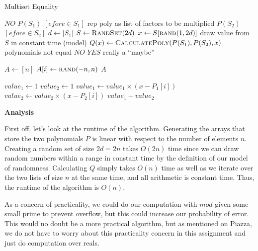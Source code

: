 \documentclass{article}
\begin{document}
\begin{algorithm}
    \caption{Multiset Equality}\label{euclid}
    \begin{algorithmic}[1]
         \Return $NO$ \EndIf
        \State $P(S_1)$ \gets $[e for e \in S_1]$  \Comment rep poly as list of factors to be multiplied
        \State $P(S_2)$ \gets $[e for e \in S_2]$
        \State $d \gets |S_1|$
        \State $S \gets \Call{RandSet}{2d}$
        \State $x \gets S[\Call{rand}{1, 2d}]$     \Comment draw value from $S$ in constant time (model)
        \State $Q(x) \gets \Call{CalculatePoly}{P(S_1), P(S_2), x}$
                                 \Comment polynomials not equal
            \State \Return $NO$
        \EndIf
        \State \Return $YES$                        \Comment really a ``maybe''
    \end{algorithmic}

    \begin{algorithmic}[1]
        \State $A \gets [n]$
            \State $A[i] \gets \Call{rand}{-n, n}$
        \EndFor
        \State \Return $A$
    \end{algorithmic}

    \begin{algorithmic}[1]
        \State $value_1 \gets 1$
        \State $value_2 \gets 1$
            \State $value_1 \gets value_1 \times (x - P_1[i])$
            \State $value_2 \gets value_2 \times (x - P_2[i])$
        \EndFor
        \State \Return $value_1 - value_2$
    \end{algorithmic}
\end{algorithm}


\textbf{Analysis}

First off, let's look at the runtime of the algorithm. Generating the arrays that store the two polynomials $P$ is
linear with respect to the number of elements $n$. Creating a random set of size $2d = 2n$ takes $O(2n)$ time since we
can draw random numbers within a range in constant time by the definition of our model of randomness. Calculating $Q$
simply takes $O(n)$ time as well as we iterate over the two lists of size $n$ at the same time, and all arithmetic is
constant time. Thus, the runtime of the algorithm is $O(n)$.

As a concern of practicality, we could do our computation with $mod$ given some small prime to prevent overflow, but
this could increase our probability of error. This would no doubt be a more practical algorithm, but as mentioned on
Piazza, we do not have to worry about this practicality concern in this assignment and just do computation over reals.
\end{document}
